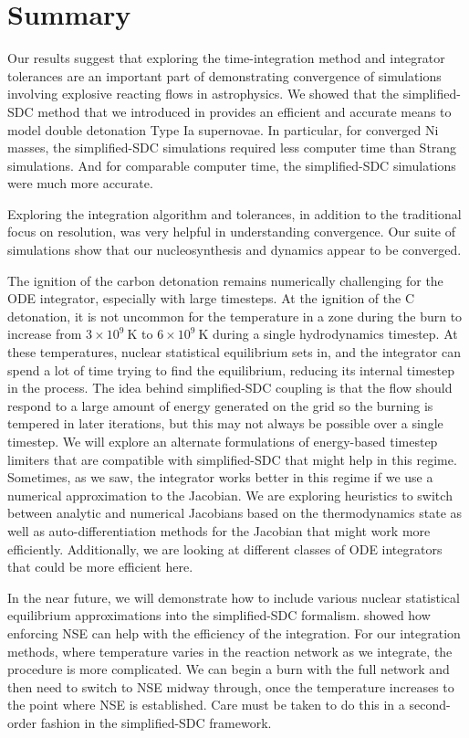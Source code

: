 \documentclass[preprint,linenumbers]{aastex631}
\begin{document}
\section{Summary}

Our results suggest that exploring the time-integration method and
integrator tolerances are an important part of demonstrating
convergence of simulations involving explosive reacting flows in
astrophysics.  We showed that the simplified-SDC method that we introduced
in \citet{castro_simple_sdc} provides an efficient and accurate means to
model double detonation Type Ia supernovae.  In particular, for converged Ni masses, the simplified-SDC simulations required less computer time than Strang simulations. 
 And for comparable computer time, the simplified-SDC simulations were much more accurate.  


Exploring the integration algorithm and tolerances, in addition to the traditional focus on resolution, was very helpful in
understanding convergence.   Our
suite of simulations show that our nucleosynthesis and dynamics appear to be converged.  


The ignition of the carbon detonation remains numerically challenging
for the ODE integrator, especially with large
timesteps.  At the ignition of the C detonation, it is not uncommon for the temperature in a zone during the burn to increase from $3\times 10^9~\mathrm{K}$ to $6\times 10^9~\mathrm{K}$ during a single hydrodynamics timestep.   At these temperatures, nuclear statistical equilibrium sets in, and the integrator can spend a lot of time trying to find the equilibrium, reducing its internal timestep in the process.  The idea behind simplified-SDC coupling is that the flow should respond to a large amount of energy generated on the grid so the burning is tempered in later iterations, but this may not always be possible over a single timestep.  We will explore an alternate formulations of energy-based timestep limiters that are compatible with simplified-SDC that might help in this regime.  Sometimes, as we saw, the integrator works better in this regime if we use a numerical approximation to the Jacobian.    We are exploring heuristics to switch between analytic and numerical Jacobians based on the thermodynamics state as well as auto-differentiation methods for the Jacobian that might work more efficiently.  Additionally, we are looking at
different classes of ODE integrators that could be more efficient here.

In the near
future, we will demonstrate how to include various nuclear statistical
equilibrium approximations into the simplified-SDC formalism. 
\citet{kushnirkatz:2020} showed how enforcing NSE can help with the efficiency of the integration.  For our integration methods, where temperature varies in the reaction network as we integrate, the procedure is more complicated.  We can
begin a burn with the full network and then need to switch to NSE midway through, once the temperature increases to the point where NSE is established.  Care must be taken to do this in a second-order fashion in the simplified-SDC framework.
\end{document}
